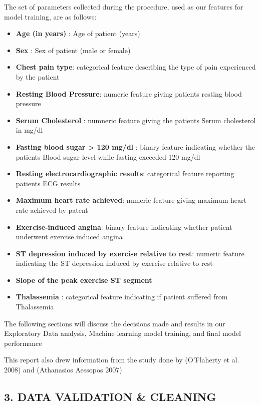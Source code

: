 \documentclass[
  letterpaper,
  DIV=11,
  numbers=noendperiod]{scrartcl}
\providecommand{\tightlist}{%
  \setlength{\itemsep}{0pt}\setlength{\parskip}{0pt}}\usepackage{longtable,booktabs,array}
\begin{document}
The set of parameters collected during the procedure, used as our
features for model training, are as follows:

\begin{itemize}
\tightlist
\item
  \textbf{Age (in years)} : Age of patient (years)
\item
  \textbf{Sex} : Sex of patient (male or female)
\item
  \textbf{Chest pain type}: categorical feature describing the type of
  pain experienced by the patient
\item
  \textbf{Resting Blood Pressure}: numeric feature giving patients
  resting blood pressure
\item
  \textbf{Serum Cholesterol} : numneric feature giving the patients
  Serum cholesterol in mg/dl
\item
  \textbf{Fasting blood sugar \textgreater{} 120 mg/dl} : binary feature
  indicating whether the patients Blood sugar level while fasting
  exceeded 120 mg/dl
\item
  \textbf{Resting electrocardiographic results}: categorical feature
  reporting patients ECG results
\item
  \textbf{Maximum heart rate achieved}: numeric feature giving maximum
  heart rate achieved by patent
\item
  \textbf{Exercise-induced angina}: binary feature indicating whether
  patient underwent exercise induced angina
\item
  \textbf{ST depression induced by exercise relative to rest}: numeric
  feature indicating the ST depression induced by exercise relative to
  rest
\item
  \textbf{Slope of the peak exercise ST segment}
\item
  \textbf{Thalassemia} : categorical feature indicating if patient
  suffered from Thalassemia
\end{itemize}

The following sections will discuss the decisions made and results in
our Exploratory Data analysis, Machine learning model training, and
final model performance

This report also drew information from the study done by (O'Flaherty et
al. 2008) and (Athanasios Aessopos 2007)

\subsection{3. DATA VALIDATION \&
CLEANING}\label{data-validation-cleaning}
\end{document}
